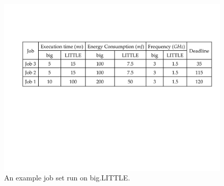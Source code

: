 \begin{figure}
\vspace{-4mm}
\centerline{
\includegraphics[width=0.55\columnwidth]{images/example_table.pdf}
} \caption{\small An example job set run on  big.LITTLE.}\vspace{-4mm}
\label{fig:big.little}
\end{figure} \normalsize

